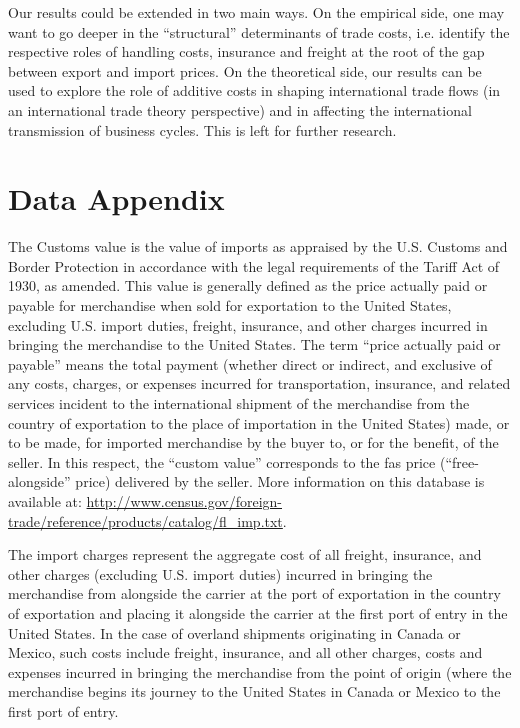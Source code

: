 \documentclass[a4paper,11pt]{article}
\begin{document}
Our results could be extended in two main ways. On the empirical side, one may want to go deeper in the ``structural'' determinants of trade costs, i.e. identify the respective roles of handling costs, insurance and freight at the root of the gap between export and import prices. On the theoretical side, our results can be used to explore the role of additive costs in shaping international trade flows (in an international trade theory perspective) and in affecting the international transmission of business cycles. This is left for further research.



\newpage




\newpage


\appendix

\section{Data Appendix \label{app:data}}


The Customs value is the value of imports as appraised by the U.S. Customs and Border Protection in accordance with the legal requirements of the Tariff Act of 1930, as amended. This value is generally defined as the price actually paid or payable for merchandise when sold for exportation to the United States, excluding U.S. import duties, freight, insurance, and other charges incurred in bringing the merchandise to the United States. The term ``price actually paid or payable'' means the total payment (whether direct or indirect, and exclusive of any costs, charges, or expenses incurred for transportation, insurance, and related services incident to the international shipment of the merchandise from the country of exportation to the place of importation in the United States) made, or to be made, for imported merchandise by the buyer to, or for the benefit, of the seller. In this respect, the ``custom value'' corresponds to the fas price (``free-alongside'' price) delivered by the seller. More information on this database is available at: \url{http://www.census.gov/foreign-trade/reference/products/catalog/fl_imp.txt}. 

The import charges represent the aggregate cost of all freight, insurance, and other charges (excluding U.S. import duties) incurred in bringing the merchandise from alongside the carrier at the port of exportation in the country of exportation and placing it alongside the carrier at the first port of entry in the United States. In the case of overland shipments originating in Canada or Mexico, such costs include freight, insurance, and all other charges, costs and expenses incurred in bringing the merchandise from the point of origin (where the merchandise begins its journey to the United States in Canada or Mexico to the first port of entry.
\end{document}
